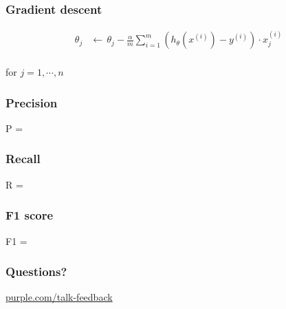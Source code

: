 \begin{frame}
  \frametitle{Gradient descent}
  \begin{bphrase}
    \begin{align*}
      \theta_j & \leftarrow\, \theta_j - \frac{\alpha}{m} \sum_{i=1}^m
                 \left(h_{\theta}(x^{(i)}) - y^{(i)}\right) \cdot x_j^{(i)} \\
    \end{align*}
    \centerline{for $j=1, \cdots, n$}
  \end{bphrase}
\end{frame}

\begin{frame}
\end{frame}

\begin{frame}
  \frametitle{Precision}
  \begin{mphrase}
    P = 
  \end{mphrase}
\end{frame}

\begin{frame}
  \frametitle{Recall}
  \begin{mphrase}
    R = 
  \end{mphrase}
\end{frame}

\begin{frame}
  \frametitle{F1 score}
  \begin{mphrase}
    F1 = 
  \end{mphrase}
\end{frame}



\begin{frame}
  \frametitle{Questions?}
  \centerline{\large\url{purple.com/talk-feedback}}
\end{frame}


